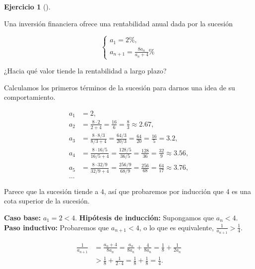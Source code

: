 \documentclass[
  spanish,
  a4paper,
]{scrreport}
\theoremstyle{definition}
\newtheorem{exercise}{Ejercicio}[chapter]
\theoremstyle{remark}
\begin{document}
\begin{exercise}[]\protect\hypertarget{exr-2}{}\label{exr-2}

Una inversión financiera ofrece una rentabilidad anual dada por la
sucesión

\[
\begin{cases}
a_1 = 2\%, \\
a_{n+1} = \frac{8a_n}{a_n+4}\%
\end{cases}
\]

¿Hacia qué valor tiende la rentabilidad a largo plazo?

\end{exercise}

\begin{tcolorbox}[enhanced jigsaw, arc=.35mm, bottomrule=.15mm, bottomtitle=1mm, breakable, colback=white, colbacktitle=quarto-callout-tip-color!10!white, colframe=quarto-callout-tip-color-frame, coltitle=black, left=2mm, leftrule=.75mm, opacityback=0, opacitybacktitle=0.6, rightrule=.15mm, title=\textcolor{quarto-callout-tip-color}{\faLightbulb}\hspace{0.5em}{Solución}, titlerule=0mm, toprule=.15mm, toptitle=1mm]

Calculamos los primeros términos de la sucesión para darnos una idea de
su comportamiento.

\begin{align*}
a_1 &= 2, \\
a_2 &= \frac{8\cdot 2}{2+4} = \frac{16}{6} = \frac{8}{3} \approx 2.67, \\
a_3 &= \frac{8\cdot 8/3}{8/3+4} = \frac{64/3}{20/3} = \frac{64}{20} = \frac{16}{5} = 3.2, \\
a_4 &= \frac{8\cdot 16/5}{16/5+4} = \frac{128/5}{36/5} = \frac{128}{36} = \frac{32}{9} \approx 3.56, \\
a_5 &= \frac{8\cdot 32/9}{32/9+4} = \frac{256/9}{68/9} = \frac{256}{68} = \frac{64}{17} \approx 3.76, \\
\ldots
\end{align*}

Parece que la sucesión tiende a \(4\), así que probaremos por inducción
que 4 es una cota superior de la sucesión.

\textbf{Caso base:} \(a_1 = 2 < 4\). \textbf{Hipótesis de inducción:}
Supongamos que \(a_n < 4\). \textbf{Paso inductivo:} Probaremos que
\(a_{n+1} < 4\), o lo que es equivalente,
\(\frac{1}{a_{n+1}} > \frac{1}{4}\).

\begin{align*}
\frac{1}{a_{n+1}}
&= \frac{a_n+4}{8a_n} 
= \frac{a_n}{8a_n} + \frac{4}{8a_n} 
= \frac{1}{8} + \frac{1}{2a_n} \\
&> \frac{1}{8} + \frac{1}{2\cdot 4}
= \frac{1}{8} + \frac{1}{8}
= \frac{1}{4}.
\end{align*}


\end{tcolorbox}
\end{document}
